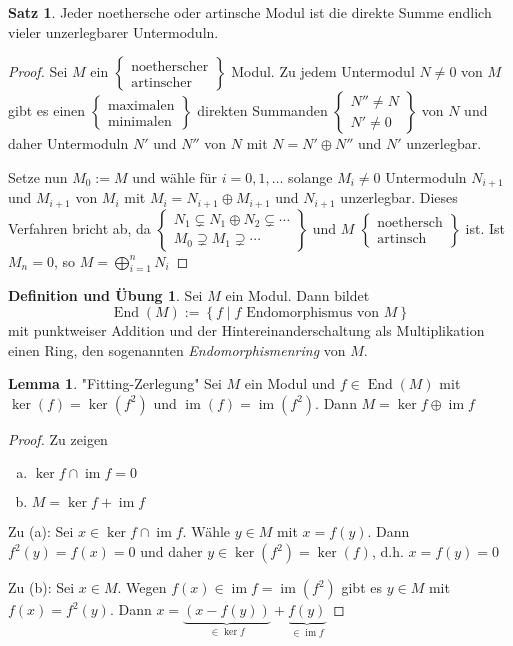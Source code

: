 \documentclass[
twoside=semi,
fontsize=12,
DIV=12, 
cleardoublepage=current,
leqno,
headings=optiontoheadandtoc, 
toc=idx
]{scrbook}
\newcommand{\set}[1]{\left\{ #1 \right\}}
\newcommand{\textcase}[2]{$\begin{Bmatrix} \textrm{#1} \\ \textrm{#2}\end{Bmatrix}$}
\newcommand{\case}[2]{\begin{Bmatrix} #1 \\ #2\end{Bmatrix}}
\DeclareMathOperator{\im}{im}
\DeclareMathOperator{\End}{End}
\theoremstyle{definition}
\newtheorem{satz}[definition]{Satz}
\newtheorem{lemma}[definition]{Lemma}
\newtheorem{defueb}[definition]{Definition und \"Ubung}
\begin{document}
	\begin{satz}\label{1.5.5}\hfill\newline
		Jeder noethersche oder artinsche Modul ist die direkte Summe endlich vieler unzerlegbarer Untermoduln.
		
		\begin{proof}
			Sei $M$ ein \textcase{noetherscher}{artinscher} Modul. Zu jedem Untermodul $N \neq 0$ von $M$ gibt es einen \textcase{maximalen}{minimalen} direkten Summanden $\case{N'' \neq N}{N' \neq 0}$ von $N$ und daher Untermoduln $N'$ und $N''$ von $N$ mit $N = N' \oplus N''$ und $N'$ unzerlegbar.
			
			Setze nun $M_0 := M$ und w\"ahle f\"ur $i=0,1,\dots$ solange $M_i\neq 0$ Untermoduln $N_{i+1}$ und $M_{i+1}$ von $M_i$ mit $M_i = N_{i+1} \oplus M_{i+1}$ und $N_{i+1}$ unzerlegbar. Dieses Verfahren bricht ab, da $\case{N_1 \subsetneq N_1 \oplus N_2 \subsetneq \cdots}{M_0 \supsetneq M_1 \supsetneq \cdots}$ und $M$ \textcase{noethersch}{artinsch} ist. Ist $M_n = 0$, so $\displaystyle M = \bigoplus_{i=1}^n N_i$
		\end{proof}
	\end{satz}

	\begin{defueb}\label{1.5.6}\hfill\newline
		Sei $M$ ein Modul. Dann bildet 
			\[\End(M):= \set{f \mid f \textrm{ Endomorphismus von } M}\] 
			mit punktweiser Addition und der Hintereinanderschaltung als Multiplikation einen Ring, den sogenannten \emph{Endomorphismenring} von $M$.
	\end{defueb}

	\begin{lemma}\label{1.5.7} "Fitting-Zerlegung"\newline
		Sei $M$ ein Modul und $f \in \End(M)$ mit $\ker(f) = \ker(f^2)$ und $\im(f) = \im(f^2)$. Dann $M = \ker f \oplus \im f$
		
		\begin{proof}
			Zu zeigen
			\begin{enumerate}[(a)]
				\item $\ker f \cap \im f = 0$
				\item $M = \ker f + \im f$
			\end{enumerate}
			Zu (a): Sei $x \in \ker f \cap \im f$. W\"ahle $y \in M$ mit $x = f(y)$. Dann $f^2(y) = f(x) = 0$ und daher $y \in \ker(f^2) = \ker(f)$, d.h. $x = f(y) = 0$
			
			\medskip\noindent Zu (b): Sei $x \in M$. Wegen $f(x) \in \im f = \im(f^2)$ gibt es $y \in M$ mit $f(x) = f^2(y)$. Dann $x = \underbrace{(x - f(y))}_{\in \ker f} + \underbrace{f(y)}_{\in \im f}$
		\end{proof}
	\end{lemma}
\end{document}
